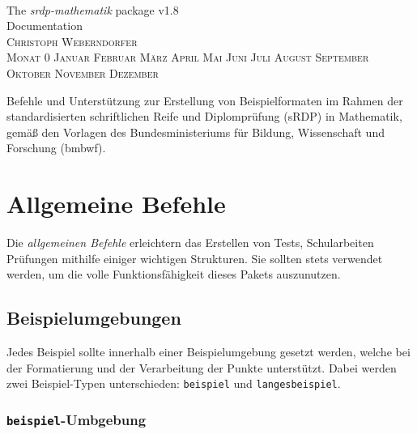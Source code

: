 \documentclass[a4paper,12pt]{article}
\makeatletter
\renewcommand*\tableofcontents{\@starttoc{toc}}
\newcommand{\Monat}{%
\ifcase\month
 Monat 0 \or Januar \or Februar \or März  \or April \or Mai \or Juni \or Juli%
 \or August \or September \or Oktober \or November \or Dezember
\fi}
\makeatother
\begin{document}
\begin{titlepage}
\thispagestyle{empty}
\begin{center}
~

\vfill

\Huge The \textit{srdp-mathematik} package v1.8\\[1cm]

Documentation \\ [1cm]

\flushright
\textsc{\large Christoph Weberndorfer} \\[-0.5cm]
\textsc{\large \Monat~\the\year} \\
\vfill

\centering
\normalsize 
Befehle und Unterstützung zur Erstellung von Beispielformaten im Rahmen der standardisierten schriftlichen Reife und Diplomprüfung (sRDP) in Mathematik, gemäß den Vorlagen des Bundesministeriums für Bildung, Wissenschaft und Forschung (bmbwf). 
\vfill 

\begingroup
\let\cleardoublepage\relax
\let\clearpage\relax
\normalsize \tableofcontents
\endgroup

\leer


\end{center}


\end{titlepage}


\section{Allgemeine Befehle}
Die \textit{allgemeinen Befehle} erleichtern das Erstellen von Tests, Schularbeiten Prüfungen mithilfe einiger wichtigen Strukturen. Sie sollten stets verwendet werden, um die volle Funktionsfähigkeit dieses Pakets auszunutzen. 
\vspace{1cm}

\subsection{Beispielumgebungen}

Jedes Beispiel sollte innerhalb einer Beispielumgebung gesetzt werden, welche bei der Formatierung und der Verarbeitung der Punkte unterstützt. Dabei werden zwei Beispiel-Typen unterschieden: \texttt{beispiel} und \texttt{langesbeispiel}.   

\vspace{1cm}
\subsubsection{\texttt{beispiel}-Umbgebung}
\end{document}
